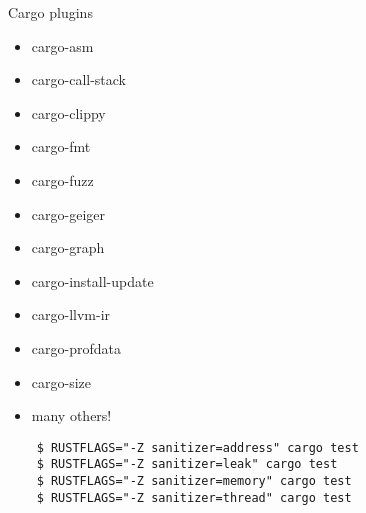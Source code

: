 \begin{frame}{\insertsubsection}
  Cargo plugins

  \begin{itemize}
  \item cargo-asm
  \item cargo-call-stack
  \item cargo-clippy
  \item cargo-fmt
  \item cargo-fuzz
  \item cargo-geiger
  \item cargo-graph
  \item cargo-install-update
  \item cargo-llvm-ir
  \item cargo-profdata
  \item cargo-size
  \item many others!
  \end{itemize}


\end{frame}

\begin{frame}[fragile]{\insertsubsection}
  \begin{verbatim}
    $ RUSTFLAGS="-Z sanitizer=address" cargo test
    $ RUSTFLAGS="-Z sanitizer=leak" cargo test
    $ RUSTFLAGS="-Z sanitizer=memory" cargo test
    $ RUSTFLAGS="-Z sanitizer=thread" cargo test
  \end{verbatim}

\end{frame} 

